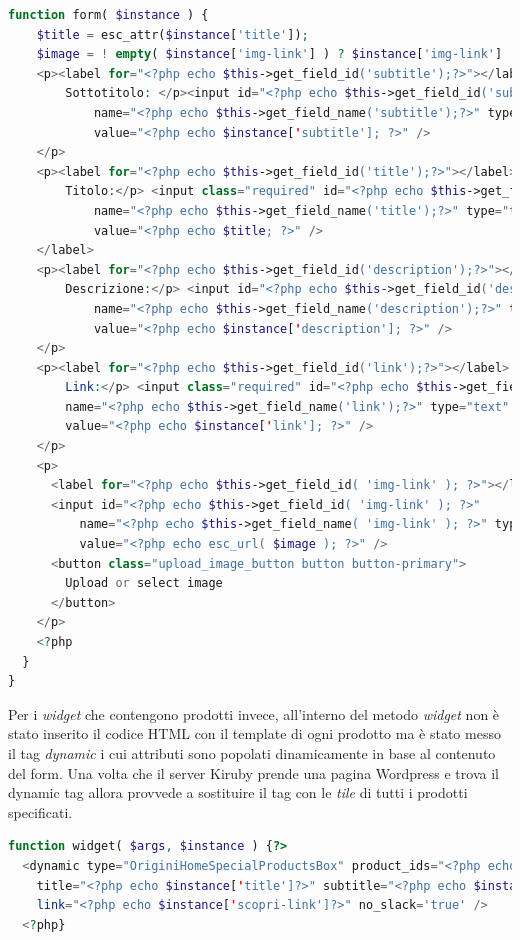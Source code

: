 \begin{lstlisting}[style=customphp, basicstyle=\tiny, language=Php,caption={Codice del widget \emph{Origini - Speciale}}]
  function form( $instance ) {
    $title = esc_attr($instance['title']);
    $image = ! empty( $instance['img-link'] ) ? $instance['img-link'] : '';?>
    <p><label for="<?php echo $this->get_field_id('subtitle');?>"></label>
        Sottotitolo: </p><input id="<?php echo $this->get_field_id('subtitle');?>" 
        	name="<?php echo $this->get_field_name('subtitle');?>" type="text" 
        	value="<?php echo $instance['subtitle']; ?>" />
    </p>
    <p><label for="<?php echo $this->get_field_id('title');?>"></label>
        Titolo:</p> <input class="required" id="<?php echo $this->get_field_id('title');?>"
        	name="<?php echo $this->get_field_name('title');?>" type="text" 
        	value="<?php echo $title; ?>" />
    </label>
    <p><label for="<?php echo $this->get_field_id('description');?>"></label>
        Descrizione:</p> <input id="<?php echo $this->get_field_id('description');?>" 
        	name="<?php echo $this->get_field_name('description');?>" type="text" 
        	value="<?php echo $instance['description']; ?>" />
    </p>
    <p><label for="<?php echo $this->get_field_id('link');?>"></label>
        Link:</p> <input class="required" id="<?php echo $this->get_field_id('link');?>" 
        name="<?php echo $this->get_field_name('link');?>" type="text" 
        value="<?php echo $instance['link']; ?>" />
    </p>
    <p>
      <label for="<?php echo $this->get_field_id( 'img-link' ); ?>"></label>
      <input id="<?php echo $this->get_field_id( 'img-link' ); ?>" 
	      name="<?php echo $this->get_field_name( 'img-link' ); ?>" type="text" 
	      value="<?php echo esc_url( $image ); ?>" />
      <button class="upload_image_button button button-primary">
      	Upload or select image
      </button>
    </p>
    <?php
  }
}
\end{lstlisting}

Per i \emph{widget} che contengono prodotti invece, all'interno del metodo \emph{widget} non è stato inserito il codice HTML con il template
di ogni prodotto ma è stato messo il tag \emph{dynamic} i cui attributi sono popolati dinamicamente in base al contenuto del form.
Una volta che il server Kiruby prende una pagina Wordpress e trova il dynamic tag allora provvede a sostituire il tag con le \emph{tile}
di tutti i prodotti specificati.

\begin{lstlisting}[style=customphp, basicstyle=\tiny, language=Php,caption={Il metodo \emph{widget} di \emph{Origini - Slider prodotti} stampa il dynamic tag che verrà letto da Kiruby e sostituito con l'HTML dei prodotti}] 
function widget( $args, $instance ) {?>
  <dynamic type="OriginiHomeSpecialProductsBox" product_ids="<?php echo $instance['ids']?>" 
    title="<?php echo $instance['title']?>" subtitle="<?php echo $instance['subtitle']?>" 
    link="<?php echo $instance['scopri-link']?>" no_slack='true' />
  <?php}
\end{lstlisting}\